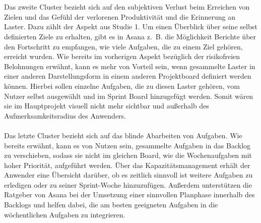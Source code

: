 \documentclass[sigconf, nonacm]{acmart}
\begin{document}
\\
\\
Das zweite Cluster bezieht sich auf den subjektiven Verlust beim Erreichen von Zielen und das Gefühl der verlorenen Produktivität und die Erinnerung an Laster. Dazu zählt der Aspekt  aus Studie 1.
Um einen Überblick über seine selbst definierten Ziele zu erhalten, gibt es in Asana z.~B. die Möglichkeit Berichte über den Fortschritt zu empfangen, wie viele Aufgaben, die zu einem Ziel gehören, erreicht wurden. Wie bereits im vorherigen Aspekt bezüglich der risikofreien Belohnungen erwähnt, kann es mehr von Vorteil sein, wenn gesammelte Laster in einer anderen Darstellungsform in einem anderen Projektboard definiert werden können. Hierbei sollen einzelne Aufgaben, die zu diesen Laster gehören, vom Nutzer selbst ausgewählt und im Sprint Board hinzugefügt werden. Somit wären sie im Hauptprojekt visuell nicht mehr sichtbar und außerhalb des Aufmerksamkeitsradius des Anwenders.
\\
\\
Das letzte Cluster bezieht sich auf das blinde Abarbeiten von Aufgaben.
Wie bereits erwähnt, kann es von Nutzen sein, gesammelte Aufgaben in das Backlog zu verschieben, sodass sie nicht im gleichen Board, wie die Wochenaufgaben mit hoher Priorität, aufgeführt werden. Über das Kapazitätsmanagement erhält der Anwender eine Übersicht darüber, ob es zeitlich sinnvoll ist weitere Aufgaben zu erledigen oder zu seiner Sprint-Woche hinzuzufügen. Außerdem unterstützen die Ratgeber von Asana bei der Umsetzung einer sinnvollen Planphase innerhalb des Backlogs und helfen dabei, die am besten geeigneten Aufgaben in die wöchentlichen Aufgaben zu integrieren.
\end{document}
